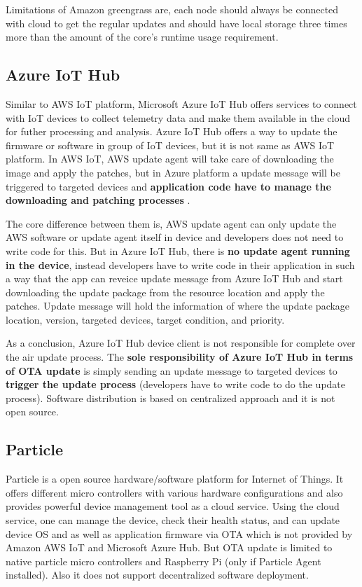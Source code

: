 \documentclass[12pt]{article}
\begin{document}
Limitations of Amazon greengrass are, each node should always be connected with cloud to get the regular updates and should have local storage three times more than the amount of the core's runtime usage requirement.


\subsection{Azure IoT Hub}

Similar to AWS IoT platform, Microsoft Azure IoT Hub offers services to connect with IoT devices to collect telemetry data and make them available in the cloud for futher processing and analysis. Azure IoT Hub offers a way to update the firmware or software in group of IoT devices, but it is not same as AWS IoT platform. In AWS IoT, AWS update agent will take care of downloading the image and apply the patches, but in Azure platform a update message will be triggered to targeted devices and \textbf{application code have to manage the downloading and patching processes} \cite{misc05}.

The core difference between them is, AWS update agent can only update the AWS software or update agent itself in device and developers does not need to write code for this. But in Azure IoT Hub, there is \textbf{no update agent running in the device}, instead developers have to write code in their application in such a way that the app can reveice update message from Azure IoT Hub and start downloading the update package from the resource location and apply the patches. Update message will hold the information of where the update package location, version, targeted devices, target condition, and priority.

As a conclusion, Azure IoT Hub device client is not responsible for complete over the air update process. The \textbf{sole responsibility of Azure IoT Hub in terms of OTA update} is simply sending an update message to targeted devices to \textbf{trigger the update process} \cite{misc05} (developers have to write code to do the update process). Software distribution is based on centralized approach and it is not open source.

\subsection{Particle}

Particle is a open source hardware/software platform for Internet of Things. It offers different micro controllers with various hardware configurations and also provides powerful device management tool as a cloud service. Using the cloud service, one can manage the device, check their health status, and can update device OS and as well as application firmware via OTA \cite{misc06} which is not provided by Amazon AWS IoT and Microsoft Azure Hub. But OTA update is limited to native particle micro controllers and Raspberry Pi (only if Particle Agent installed). Also it does not support decentralized software deployment.
\end{document}
